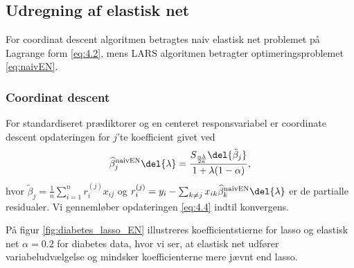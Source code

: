 %
\subsection{Udregning af elastisk net}
For coordinat descent algoritmen betragtes naiv elastisk net problemet på Lagrange form \eqref{eq:4.2}, mens LARS algoritmen betragter optimeringsproblemet \eqref{eq:naivEN}.
%
\subsubsection{Coordinat descent}
For standardiseret prædiktorer og en centeret responsvariabel er coordinate descent opdateringen for $j$'te koefficient givet ved
\begin{align}
\widehat{\beta}^\text{naivEN}_j \del{\lambda}= \frac{S_{\frac{\alpha \lambda}{2n}} \del{\tilde{\beta}_j}}{1 + \lambda (1-\alpha)}, \label{eq:4.4}
\end{align}
hvor \(\tilde{\beta}_j = \frac{1}{n} \sum_{i=1}^n r_{i}^{(j)} x_{ij}\) og \(r_{i}^{(j)} = y_i - \sum_{k \neq j} x_{ik} \widehat{\beta}^\text{naivEN}_k \del{\lambda}\) er de partialle residualer.
Vi gennemløber opdateringen \eqref{eq:4.4} indtil konvergens.

\begin{eks}
På figur \ref{fig:diabetes_lasso_EN} illustreres koefficientstierne for lasso og elastisk net \(\alpha = 0.2\) for diabetes data, hvor vi ser, at elastisk net udfører variabeludvælgelse og mindsker koefficienterne mere jævnt end lasso.

\end{eks}

